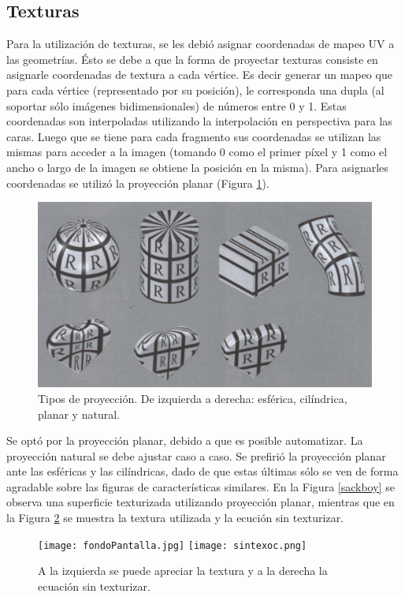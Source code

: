\documentclass[12pt]{article}
\begin{document}
\subsection{Texturas}
\noindent Para la utilización de texturas, se les debió asignar coordenadas de mapeo UV a las geometrías. Ésto se debe a que la forma de proyectar texturas consiste en asignarle coordenadas de textura a cada vértice. Es decir generar un mapeo que para cada vértice (representado por su posición), le corresponda una dupla (al soportar sólo imágenes bidimensionales) de números entre 0 y 1.  Estas coordenadas son interpoladas utilizando la interpolación en perspectiva para las caras\cite{realtimerendering}\cite{engine}. Luego que se tiene para cada fragmento sus coordenadas se utilizan las mismas para acceder a la imagen (tomando 0 como el primer píxel y 1 como el ancho o largo de la imagen se obtiene la posición en la misma). Para asignarles coordenadas se utilizó la proyección planar\cite{realtimerendering} (Figura \ref{texturas}).
\begin{figure}[h!]
\includegraphics[width =0.5\linewidth, center]{proyecciones.png}
\caption{Tipos de proyección. De izquierda a derecha: esférica, cilíndrica, planar y natural.}
\label{texturas}
\end{figure}

Se optó por la proyección planar, debido a que es posible automatizar. La proyección natural se debe ajustar caso a caso. Se prefirió la proyección planar ante las esféricas y las cilíndricas, dado de que estas últimas sólo se ven de forma agradable sobre las figuras de características similares. En la Figura \ref{sackboy} se observa una superficie texturizada utilizando proyección planar, mientras que en la Figura \ref{sintextura} se muestra la textura utilizada y la ecución sin texturizar.

\begin{figure}[h!]
\texttt{[image: fondoPantalla.jpg]}
\hfill
\texttt{[image: sintexoc.png]}
\caption{ A la izquierda se puede apreciar la textura y a la derecha la ecuación sin texturizar.}
\label{sintextura}
\end{figure}
\end{document}
